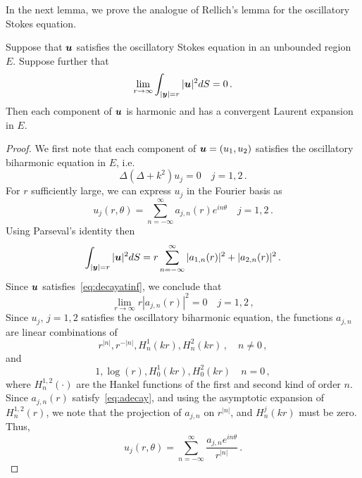In the next lemma, we prove the analogue of Rellich's lemma for the
oscillatory Stokes equation. 
\begin{lem}
\label{lem:rellich}
Suppose that ${\boldsymbol u}$ satisfies the oscillatory Stokes equation in an unbounded
region $E$.  
Suppose further that 
\begin{equation}
\lim_{r \to \infty} \int_{|{\boldsymbol y}|=r} |{\boldsymbol u}|^2 dS = 0 
\, . \label{eq:decayatinf}
\end{equation}
Then each component of ${\boldsymbol u}$ is harmonic and has a convergent Laurent
expansion in $E$.
\end{lem}
\begin{proof}
We first note that each component of ${\boldsymbol u}= (u_{1},u_{2})$ satisfies the 
oscillatory biharmonic equation in $E$, i.e.
\begin{equation}
\Delta (\Delta + k^2) u_{j} = 0 \quad j=1,2 \,. 
\end{equation}
For $r$ sufficiently large, we can express $u_{j}$ in the Fourier basis as
\begin{equation}
u_{j}(r,\theta) = \sum_{n=-\infty}^{\infty} a_{j,n}(r) e^{i n \theta}  \quad 
j=1,2 \, .
\end{equation}
Using Parseval's identity then
\begin{equation}
\int_{|{\boldsymbol y}|=r} |{\boldsymbol u}|^2 dS = r\sum_{n=-\infty}^{\infty} |a_{1,n}(r)|^2  +
|a_{2,n}(r)|^2 \, .
\end{equation}
Since ${\boldsymbol u}$ satisfies~\cref{eq:decayatinf}, we conclude that
\begin{equation}
\lim_{r\to\infty} r|a_{j,n}(r)|^2 = 0 \quad j=1,2 \, , \label{eq:adecay}
\end{equation}
Since $u_{j}$, $j=1,2$ satisfies the oscillatory biharmonic equation,
the functions $a_{j,n}$ are linear combinations of 
\begin{equation}
r^{|n|}, r^{-|n|}, H^{1}_{n}(k r), H^{2}_{n}(k r) \, , \quad
n\neq 0 \, ,
\end{equation}
and
\begin{equation}
1, \log{(r)}, H^{1}_{0}(k r), H^{2}_{0}(k r) \quad n=0 \, , 
\end{equation} 
where $H_{n}^{1,2}(\cdot)$ are the Hankel functions of the first and
second kind of order $n$.
Since $a_{j,n}(r)$ satisfy~\cref{eq:adecay}, and using the asymptotic 
expansion of $H_{n}^{1,2}(r)$, we note that the projection of 
$a_{j,n}$ on $r^{|n|}$, and $H_{n}^{j}(k r)$ must be zero. 
Thus, 
\begin{equation}
u_{j}(r,\theta) = \sum_{n=-\infty}^{\infty} \frac{a_{j,n} e^{i n \theta}}{r^{|n|}} 
\, .
\end{equation}
\end{proof}
